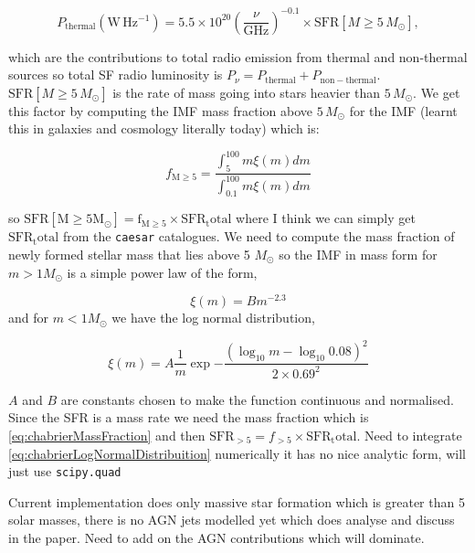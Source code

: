 \documentclass[a4paper, 11pt, oneside]{researchjournal} %
\begin{document}
\begin{equation}
P_{\mathrm{thermal}} (\mathrm{W\,Hz^{-1}})
= 5.5 \times 10^{20}
\left(\frac{\nu}{\mathrm{GHz}}\right)^{-0.1}
\times \mathrm{SFR}[M \geq 5\,M_\odot],
\end{equation}

\noindent which are the contributions to total radio emission from thermal and non-thermal sources so total SF radio luminosity is $P_\nu = P_\mathrm{thermal} + P_\mathrm{non-thermal}$. $\mathrm{SFR}[M \geq 5\,M_\odot]$ is the rate of mass going into stars heavier than $5\,M_\odot$. We get this factor by computing the IMF mass fraction above $5\,M_\odot$ for the \cite{chabrierGalacticStellarSubstellar2003} IMF (learnt this in galaxies and cosmology literally today) which is:

\begin{equation}
    f_\mathrm{M\ge5} = \frac{\int_{5}^{100}m\xi(m)dm}{\int_{0.1}^{100}m\xi(m)dm}
    \label{eq:chabrierMassFraction}
\end{equation}

\noindent so $\mathrm{SFR[M\ge5M_\odot]=f_{M\ge5} \times \mathrm{SFR_total}}$ where I think we can simply get $\mathrm{SFR_total}$ from the \texttt{caesar} catalogues. We need to compute the mass fraction of newly formed stellar mass that lies above 5 $M_\odot$ so the IMF in mass form for $m>1M_\odot$ is a simple power law of the form,

\begin{equation}
    \xi(m) = Bm^{-2.3}
    \label{eq:chabrierPowerLaw}
\end{equation}
\noindent and for $m<1M_\odot$ we have the log normal distribution,

\begin{equation}
    \xi(m) = A \frac{1}{m}\exp{-\frac{(\log_{10}m - \log_{10}0.08)^2 }{2 \times 0.69^2}}
    \label{eq:chabrierLogNormalDistribuition}
\end{equation}

\noindent $A$ and $B$ are constants chosen to make the function continuous and normalised. Since the SFR is a mass rate we need the mass fraction which is \cref{eq:chabrierMassFraction} and then $\mathrm{SFR}_{>5}=f_{>5} \times \mathrm{SFR_total}$. Need to integrate \cref{eq:chabrierLogNormalDistribuition} numerically it has no nice analytic form, will just use \texttt{scipy.quad}

Current implementation does only massive star formation which is greater than 5 solar masses, there is no AGN jets modelled yet which \cite{thomasRadioGalaxyPopulation2021} does analyse and discuss in the paper. Need to add on the AGN contributions which will dominate.
\end{document}
